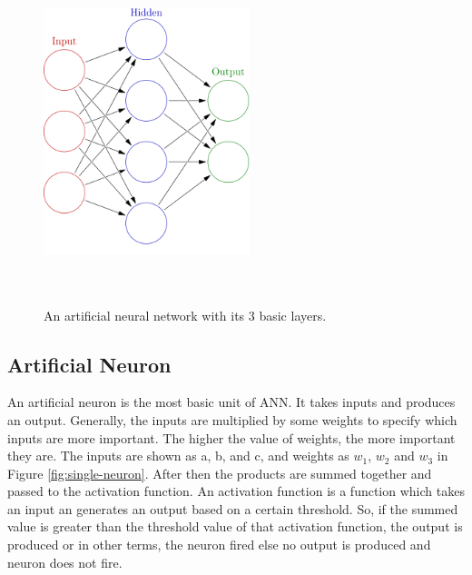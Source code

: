 \begin{figure}[htpb]
	\centering
	\includegraphics[width=6cm,height=10cm,keepaspectratio=true]{images/neural-net}
	\caption{
		An artificial neural network with its 3 basic layers\cite{wiki:ann}.
	}
	\label{fig:wiki:ann}
\end{figure}


\subsection{Artificial Neuron}
An artificial neuron is the most basic unit of ANN. It takes inputs and produces an output. Generally, the inputs are multiplied by some weights to specify which inputs are more important. The higher the value of weights, the more important they are. The inputs are shown as a, b, and c, and weights as $w_1$, $w_2$ and $w_3$ in Figure \ref{fig:single-neuron}. After then the products are summed together and passed to the activation function. An activation function is a function which takes an input an generates an output based on a certain threshold. So, if the summed value is greater than the threshold value of that activation function, the output is produced or in other terms, the neuron fired else no output is produced and neuron does not fire.

